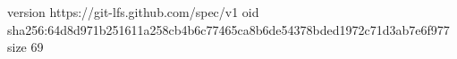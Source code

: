 version https://git-lfs.github.com/spec/v1
oid sha256:64d8d971b251611a258cb4b6c77465ca8b6de54378bded1972c71d3ab7e6f977
size 69
